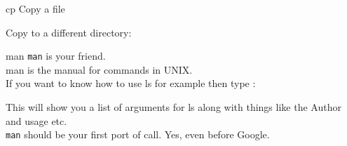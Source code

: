 \documentclass{beamer}
\begin{document}
\begin{frame}{cp}
Copy a file\\
\begin{center}
\end{center}
Copy to a different directory:
\begin{center}
\end{center}
\end{frame}

\begin{frame}{man}
\texttt{man} is your friend.\\man is the manual for commands in UNIX.\\If you want to know how to use ls for example then type : 
\begin{center}
\end{center}
This will show you a list of arguments for ls along with things like the Author and usage etc.\\
\texttt{man} should be your first port of call. Yes, even before Google.
\end{frame}
\end{document}
